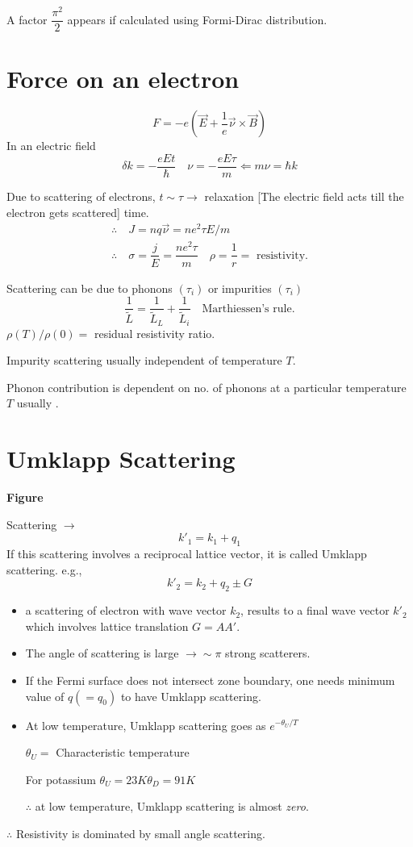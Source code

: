A factor $\dfrac{\pi^{2}}{2}$ appears if calculated using Formi-Dirac distribution.

\section*{Force on an electron}
$$
F=-e(\overrightarrow{E}+\dfrac{1}{e}\overrightarrow{\nu}\times \overrightarrow{B})
$$
In an electric field
$$
\delta k=-\dfrac{eEt}{\hbar}\quad \nu=-\dfrac{eE\tau}{m}\Leftarrow m\nu=\hbar k
$$

Due to scattering of electrons, $t\sim \tau\to$ relaxation [The electric field acts till the electron gets scattered] time.
\begin{gather*}
\therefore\quad J=nq\overrightarrow{\nu}=ne^{2}\tau E/m\\
\therefore\quad \sigma =\dfrac{j}{E}=\dfrac{ne^{2}\tau}{m}\quad \rho=\dfrac{1}{r}=\text{ resistivity.}
\end{gather*}

Scattering can be due to phonons $(\tau_{i})$ or impurities $(\tau_{i})$
$$
\dfrac{1}{\widetilde{L}}=\dfrac{1}{\widetilde{L}_{L}}+\dfrac{1}{\widetilde{L}_{i}}\quad \text{Marthiessen's rule.}
$$
$\rho(T)/\rho(0)=$ residual resistivity ratio.

Impurity scattering usually independent of temperature $T$.

Phonon contribution is dependent on no. of phonons at a particular temperature $T$ usually .

\section*{Umklapp Scattering}
\begin{center}
{\bf Figure}
\end{center}

Scattering $\to$
$$
k'_{1}=k_{1}+q_{1}
$$
If this scattering involves a reciprocal lattice vector, it is called Umklapp scattering. e.g.,
$$
k'_{2}=k_{2}+q_{2}\pm G
$$
\begin{itemize}
\item a scattering of electron with wave vector $k_{2}$, results to a final wave vector $k'_{2}$ which involves lattice translation $G=AA'$.

\item The angle of scattering is large $\to \sim \pi$ strong scatterers.

\item If the Fermi surface does not intersect zone boundary, one needs minimum value of $q(=q_{0})$ to have Umklapp scattering.

\item At low temperature, Umklapp scattering goes as $e^{-\theta_{U}/T}$

$\theta_{U}=$ Characteristic temperature

For potassium $\theta_{U}=23K$\quad $\theta_{D}=91K$

$\therefore$ at low temperature, Umklapp scattering is almost {\em zero}.
\end{itemize}
$\therefore$ Resistivity is dominated by small angle scattering.

